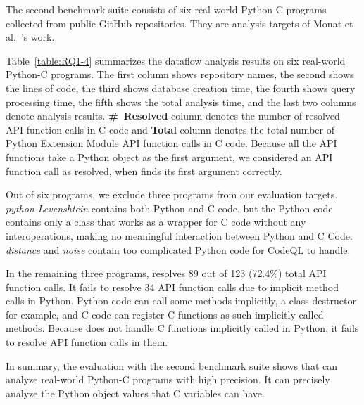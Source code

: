 

The second benchmark suite consists of six real-world Python-C programs
collected from public GitHub repositories. They are analysis targets of
Monat et al.~\cite{sas2021}'s work.

Table~\ref{table:RQ1-4} summarizes the dataflow analysis results on six
real-world Python-C programs. 
The first column shows repository names, the second shows the lines of code,
the third shows database creation time,
the fourth shows query processing time, the fifth shows the total analysis time,
and the last two columns denote analysis results.
{\bf \#~Resolved} column denotes the number of resolved API function calls in C code and
{\bf Total} column denotes the total number of Python Extension Module API function
calls in C code. 
Because all the API functions take a Python object as the first argument, we
considered an API function call as resolved, when \ours finds its first argument
correctly. 


Out of six programs, we exclude three programs from our evaluation targets.
{\it python-Levenshtein} contains both Python and C code, but the Python code
contains only a class that works as a wrapper for C code without any interoperations,
making no meaningful interaction between Python and C Code.
{\it distance} and {\it noise} contain too complicated Python code for CodeQL
to handle.

In the remaining three programs, \ours resolves 89 out of 123 (72.4\%) total
API function calls. 
It fails to resolve 34 API function calls due to implicit method calls in Python. 
Python code can call some methods implicitly, a class destructor for example, and C
code can register C functions as such implicitly called methods. 
Because \ours does not handle C functions implicitly called in Python, it
fails to resolve API function calls in them.

In summary, the evaluation with the second benchmark suite shows that
\ours can analyze real-world Python-C programs with high precision.
It can precisely analyze the Python object values that C variables can have.



